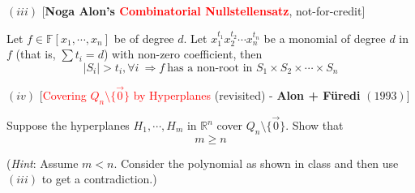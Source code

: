 \documentclass[10pt]{article}
\begin{document}
$(iii)$ [\textbf{Noga Alon's \textcolor{red}{Combinatorial Nullstellensatz}}, not-for-credit]\medskip

Let $f\in \mathbb{F}[x_1,\cdots, x_n]$ be of degree $d$. Let $x_1^{t_1}x_2^{t_2}\cdots x_n^{t_n}$ be a monomial of degree $d$ in $f$ (that is, $\sum t_i=d$) with non-zero coefficient, then $$\boxed{|S_i|>t_i, \forall i ~\Rightarrow f~ \text{has a non-root in}\,\, S_1\times S_2\times\cdots \times S_n}$$

$(iv)$ [\textcolor{red}{Covering $Q_n\setminus \{\overrightarrow{0}\}$ by Hyperplanes} (revisited) - \textbf{Alon + F\"uredi} $(1993)$]\smallskip

Suppose the hyperplanes $H_1,\cdots, H_m$ in $\mathbb{R}^n$ cover $Q_n\setminus \{\overrightarrow{0}\}$. Show that $$m\ge n$$

(\emph{Hint}: Assume $m<n$. Consider the polynomial as shown in class and then use $(iii)$ to get a contradiction.)
\end{document}
